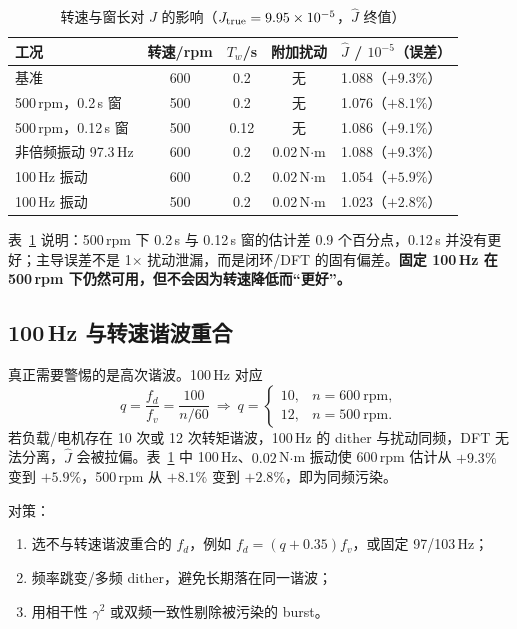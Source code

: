 \documentclass[11pt,a4paper]{article}
\newcommand{\Jhat}{\hat J}
\begin{document}
\begin{table}[H]
\centering\footnotesize
\caption{转速与窗长对 $\Jhat$ 的影响（$J_{\rm true}=9.95\times10^{-5}$，$\Jhat$ 终值）}\label{tab:speed}
\begin{tabular}{@{}lcccl@{}}
\toprule
工况 & 转速/rpm & $T_w$/s & 附加扰动 & $\Jhat$ / $10^{-5}$（误差）\\
\midrule
基准 & 600 & 0.2 & 无 & 1.088（$+9.3\%$）\\
500\,rpm，0.2\,s 窗 & 500 & 0.2 & 无 & 1.076（$+8.1\%$）\\
500\,rpm，0.12\,s 窗 & 500 & 0.12 & 无 & 1.086（$+9.1\%$）\\
非倍频振动 97.3\,Hz & 600 & 0.2 & $0.02$\,N$\cdot$m & 1.088（$+9.3\%$）\\
100\,Hz 振动 & 600 & 0.2 & $0.02$\,N$\cdot$m & 1.054（$+5.9\%$）\\
100\,Hz 振动 & 500 & 0.2 & $0.02$\,N$\cdot$m & 1.023（$+2.8\%$）\\
\bottomrule
\end{tabular}
\end{table}

表~\ref{tab:speed} 说明：500\,rpm 下 0.2\,s 与 0.12\,s 窗的估计差 0.9 个百分点，0.12\,s 并没有更好；主导误差不是 1$\times$ 扰动泄漏，而是闭环/DFT 的固有偏差。\textbf{固定 100\,Hz 在 500\,rpm 下仍然可用，但不会因为转速降低而“更好”。}

\subsection{100\,Hz 与转速谐波重合}

真正需要警惕的是高次谐波。100\,Hz 对应
\begin{equation}
q=\frac{f_d}{f_v}=\frac{100}{n/60}
\ \Longrightarrow\
q=\begin{cases}
10, & n=600\ \mathrm{rpm},\\
12, & n=500\ \mathrm{rpm}.
\end{cases}
\label{eq:harmq}
\end{equation}
若负载/电机存在 10 次或 12 次转矩谐波，100\,Hz 的 dither 与扰动同频，DFT 无法分离，$\Jhat$ 会被拉偏。表~\ref{tab:speed} 中 100\,Hz、$0.02$\,N$\cdot$m 振动使 600\,rpm 估计从 $+9.3\%$ 变到 $+5.9\%$，500\,rpm 从 $+8.1\%$ 变到 $+2.8\%$，即为同频污染。

对策：
\begin{enumerate}
  \item 选不与转速谐波重合的 $f_d$，例如 $f_d=(q+0.35)f_v$，或固定 97/103\,Hz；
  \item 频率跳变/多频 dither，避免长期落在同一谐波；
  \item 用相干性 $\gamma^2$ 或双频一致性剔除被污染的 burst。
\end{enumerate}
\end{document}
